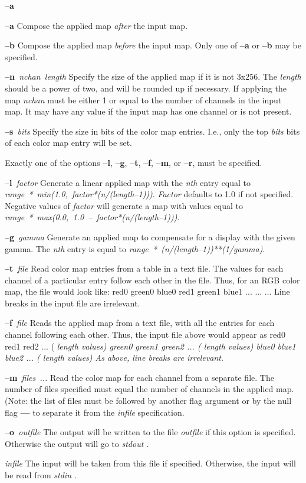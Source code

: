 \begin{TPlist}{{\bf --a}}
\item[{{\bf --a}}]
Compose the applied map 
{\it after}
the input map.
\item[{{\bf --b}}]
Compose the applied map
{\it before}
the input map.  Only one of
{\bf --a}
or
{\bf --b}
may be specified.
\item[{{\bf --n}{\it \ nchan\ length}
}]
Specify the size of the applied map if it is not 3x256.  The
{\it length}
should be a power of two, and will be rounded up if necessary.  If
applying the map
{\it nchan}
must be either 1 or equal to the number of channels in the input map.
It may have any value if the input map has one channel or is not
present.
\item[{{\bf --s}{\it \ bits}
}]
Specify the size in bits of the color map entries.  I.e., only the top
{\it bits}
bits of each color map entry will be set.

Exactly one of the options
{\bf --l}{\rm ,}
{\bf --g}{\rm ,}
{\bf --t}{\rm ,}
{\bf --f}{\rm ,}
{\bf --m}{\rm ,}
or
{\bf --r}{\rm ,}
must be specified.
\item[{{\bf --l}{\it \ factor}
}]
Generate a linear applied map with the 
{\it nth}
entry equal to
\nwl
{\it 		range\ *\ min(1.0,\ factor*(n/(length--1)))}{\rm .}
\nwl
{\it Factor}
defaults to 1.0 if not specified.  Negative values of
{\it factor}
will generate a map with values equal to
\nwl
{\it 		range\ *\ max(0.0,\ 1.0\ --\ factor*(n/(length--1)))}{\rm .}
\item[{{\bf --g}{\it \ gamma}
}]
Generate an applied map to compensate for a display
with the given gamma.  The 
{\it nth}
entry is equal to
\nwl
{\it 		range\ *\ (n/(length--1))**(1/gamma)}{\rm .}
\item[{{\bf --t}{\it \ file}
}]
Read color map entries from a table in a text file.  The values for each
channel of a particular entry follow each other in the file.  Thus,
for an RGB color map, the file would look like:
\nwl
		red0	green0	blue0
\nwl
		red1	green1	blue1
\nwl
		...	...	...
\nwl
Line breaks in the input file are irrelevant.
\item[{{\bf --f}{\it \ file}
}]
Reads the applied map from a text file, with all the entries for each
channel following each other.  Thus, the input file above would appear
as
\nwl
		red0 red1 red2 ... (%
\it length \rm%
values)
\nwl
		green0 green1 green2 ... (%
\it length \rm%
values)
\nwl
		blue0 blue1 blue2 ... (%
\it length \rm%
values)
\nwl
As above, line breaks are irrelevant.
\item[{{\bf --m}{\it \ files\ ...}
}]
Read the color map for each channel from a separate file.  The number
of files specified must equal the number of channels in the applied
map.  (Note: the list of files must be followed by another flag
argument or by the null flag
{\bf --\/--}
to separate it from the
{\it infile}
specification.
\item[{{\bf --o}{\it \ outfile}
}]
The output will be written to the file
{\it outfile}
if this option is specified.  Otherwise the output will go to %
\it stdout\rm%
.
\item[{{\it infile}}]
The input will be taken from this file if specified.  Otherwise, the
input will be read from %
\it stdin\rm%
.
\end{TPlist}
